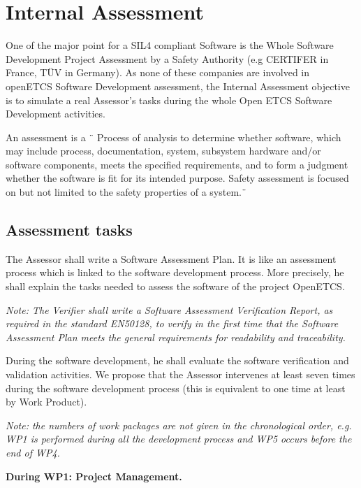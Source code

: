 \section{Internal Assessment}
One of the major point for a SIL4 compliant Software is the Whole Software Development Project Assessment by a Safety Authority (e.g CERTIFER in France, TÜV in Germany). As none of these companies are involved in openETCS Software Development assessment, the Internal Assessment objective is to simulate a real Assessor's tasks during the whole Open ETCS Software Development activities.

An assessment is a ¨ Process of analysis to determine whether software, which may include process, documentation, system, subsystem hardware and/or software components, meets the specified requirements, and to form a judgment whether the software is fit for its intended purpose. Safety assessment is focused on but not limited to the safety properties of a system.¨
\subsection{Assessment tasks}
The Assessor shall write a Software Assessment Plan. It is like an assessment process which is linked to the software development process.
More precisely, he shall explain the tasks needed to assess the software of the project OpenETCS.

{\itshape 
Note: The Verifier shall write a Software Assessment Verification Report, as required in the standard EN50128, to verify in the first time that the Software Assessment Plan meets the general requirements for readability and traceability.
}

During the software development, he shall evaluate the software verification and validation activities.
We propose that the Assessor intervenes at least seven times during the software development process (this is equivalent to one time at least by Work Product).

\textit{
Note: the numbers of work packages are not given in the chronological order, e.g. WP1 is performed during all the development process and WP5 occurs before the end of WP4.
}


\textbf{
During WP1: Project Management.
}

